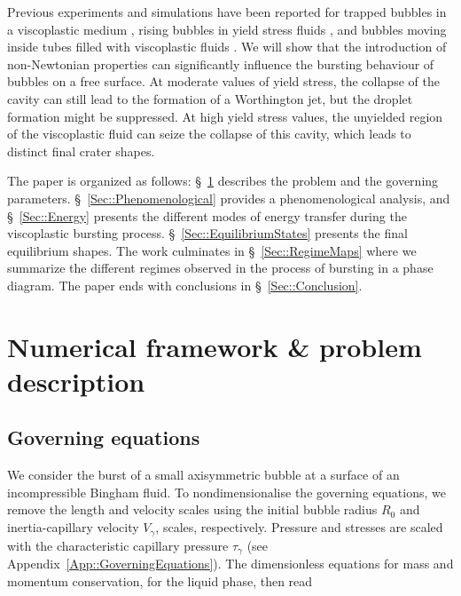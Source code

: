 \documentclass[final]{jfm}
\begin{document}
Previous experiments and simulations have been reported for trapped bubbles in a viscoplastic medium \citep{dubash2004conditions,sun2020dynamic, de2019oscillations}, rising bubbles in yield stress fluids \citep{sikorski2009motion,tripathi2015bubble, lopez2018rising,singh2008interacting, dimakopoulos2013steady, tsamopoulos2008steady, mougin2012significant}, and bubbles moving inside tubes filled with viscoplastic fluids \citep{jalaal2016long, laborie2017yield, zamankhan2018steady}. We will show that the introduction of non-Newtonian properties can significantly influence the bursting behaviour of bubbles on a free surface. At moderate values of yield stress, the collapse of the cavity can still lead to the formation of a Worthington jet, but the droplet formation might be suppressed. At high yield stress values, the unyielded region of the viscoplastic fluid can seize the collapse of this cavity, which leads to distinct final crater shapes.

The paper is organized as follows: \S~\ref{Sec::ProblemDescription} describes the problem and the governing parameters. \S~\ref{Sec::Phenomenological} provides a phenomenological analysis, and \S~\ref{Sec::Energy} presents the different modes of energy transfer during the viscoplastic bursting process. \S~\ref{Sec::EquilibriumStates} presents the final equilibrium shapes. The work culminates in \S~\ref{Sec::RegimeMaps} where we summarize the different regimes observed in the process of bursting in a phase diagram. The paper ends with conclusions in \S~\ref{Sec::Conclusion}.

\section{Numerical framework \& problem description}\label{Sec::ProblemDescription}
\subsection{Governing equations}\label{Sec::DimensionlessForm}
We consider the burst of a small axisymmetric bubble at a surface of an incompressible Bingham fluid. To nondimensionalise the governing equations, we remove the length and velocity scales using the initial bubble radius $R_0$ and inertia-capillary velocity $V_\gamma$, scales, respectively. Pressure and stresses are scaled with the characteristic capillary pressure $\tau_\gamma$ (see Appendix~\ref{App::GoverningEquations}). The dimensionless equations for mass and momentum conservation, for the liquid phase, then read
\end{document}
